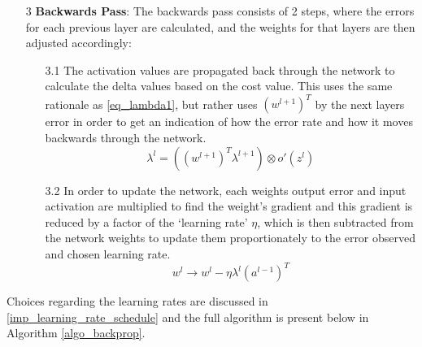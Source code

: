 \documentclass[a4paper,latin]{paper}
\begin{document}
\begin{itemize}
	\item [3] \textbf{Backwards Pass}: The backwards pass consists of 2 steps, where the errors for each previous layer are calculated, and the weights for that layers are then adjusted accordingly:
		\begin{itemize}
		\item [3.1] The activation values are propagated back through the network to calculate the delta values based on the cost value. This uses the same rationale as \eqref{eq_lambda1}, but rather uses $(w^{l+1})^T$ by the next layers error in order to get an indication of how the error rate and how it moves backwards through the network.
						\begin{equation}\label{eq_lambda4}
						\lambda^l = ((w^{l+1})^T\lambda^{l+1})  \otimes o'(z^l)
						\end{equation}
		\item [3.2] In order to update the network, each weights output error and input activation are multiplied to find the weight’s gradient and this gradient is reduced by a factor of the ‘learning rate’ $\eta$, which is then subtracted from the network weights to update them proportionately to the error observed and chosen learning rate.
						\begin{equation}\label{eq_bp_weightupdate}
						w^l \rightarrow w^l - {\eta}\lambda^{l} (a^{l - 1})^T
						\end{equation}
	\end{itemize}
		
\end{itemize}

Choices regarding the learning rates are discussed in \ref{imp_learning_rate_schedule} and the full algorithm is present below in Algorithm \ref{algo_backprop}.\newline
\end{document}
